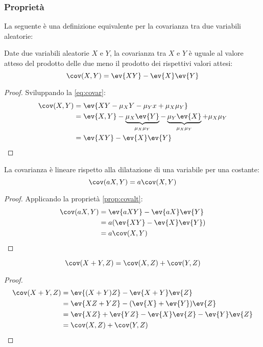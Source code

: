 \subsubsection{Proprietà}
La seguente è una definizione equivalente per la covarianza tra due variabili aleatorie:
\begin{prop} \label{prop:covalt}
	Date due variabili aleatorie $X$ e $Y$, la covarianza tra $X$ e $Y$ è uguale al valore atteso del prodotto delle due meno il prodotto dei rispettivi valori attesi:
	\begin{equation*}
		\cov(X,Y)=\ev{XY}-\ev{X}\ev{Y}
	\end{equation*}
\end{prop}
\begin{proof}
	Sviluppando la \eqref{eq:covar}:
	\begin{align*}
		\cov(X,Y) & = \ev{XY-\mu_X Y-\mu_Y x + \mu_X\mu_Y}                                                            \\
		          & = \ev{X,Y}-\underbrace{\mu_X\ev{Y}}_{\mu_X\mu_Y}-\underbrace{\mu_Y\ev{X}}_{\mu_X\mu_Y}+\mu_X\mu_Y \\
		          & =\ev{XY}-\ev{X}\ev{Y}
	\end{align*}
\end{proof}

\begin{prop}
	La covarianza è lineare rispetto alla dilatazione di una variabile per una costante:
	\begin{equation*}
		\cov(aX,Y)=a\cov(X,Y)
	\end{equation*}
\end{prop}
\begin{proof}
	Applicando la proprietà \ref{prop:covalt}:
	\begin{align*}
		\cov(aX,Y) & = \ev{aXY}-\ev{aX}\ev{Y}  \\
		           & = a(\ev{XY}-\ev{X}\ev{Y}) \\
		           & = a\cov(X,Y)
	\end{align*}
\end{proof}

\begin{prop} \label{prop:covsum0}
	\begin{equation*}
		\cov(X+Y,Z)=\cov(X,Z)+\cov(Y,Z)
	\end{equation*}
\end{prop}
\begin{proof}
	\begin{align*}
		\cov(X+Y,Z) & = \ev{(X+Y)Z} - \ev{X+Y}\ev{Z}                    \\
		            & = \ev{XZ+YZ} - (\ev{X} + \ev{Y}) \ev{Z}           \\
		            & = \ev{XZ} + \ev{YZ} - \ev{X}\ev{Z} - \ev{Y}\ev{Z} \\
		            & = \cov(X,Z) + \cov(Y,Z)
	\end{align*}
\end{proof}

